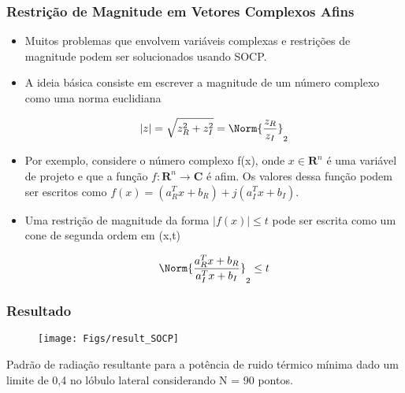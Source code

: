 \begin{frame}
\frametitle{Restrição de Magnitude em Vetores Complexos Afins}
\begin{itemize}
\item Muitos problemas que envolvem variáveis complexas e restri\c{c}\~oes de magnitude podem ser solucionados usando SOCP.

\item A ideia básica consiste em escrever a magnitude de um n\'umero complexo como uma norma euclidiana

\begin{equation*}
|z| = \sqrt{z_{R}^{2} + z_{I}^{2}} = \Norm{\dfrac{z_{R}}{z_{I}}}_{2}
\end{equation*}

\item Por exemplo, considere o n\'umero complexo f(x), onde $x \in \mathbf{R}^{n}$ é uma variável de projeto e que a função $f: \mathbf{R}^{n} \rightarrow \mathbf{C}$ é afim. Os valores dessa função podem ser escritos como $f(x) = (a_{R}^{T}x + b_{R}) + j (a_{I}^{T}x + b_{I})$.

\item Uma restrição de magnitude da forma $|f(x)| \leq t$ pode ser escrita como um cone de segunda ordem em (x,t)

\begin{equation*}
\Norm{\dfrac{a_{R}^{T}x + b_{R}}{a_{I}^{T}x + b_{I}}}_{2} \leq t
\end{equation*}
\end{itemize}
\end{frame}

%

\begin{frame}
\frametitle{Resultado}
\begin{figure}
\centering
\texttt{[image: Figs/result\_SOCP]}
\end{figure}

Padr\~ao de radiação resultante para a pot\^encia de ruido térmico m\'inima dado um limite de 0,4 no lóbulo lateral considerando N = 90 pontos.
\end{frame}

